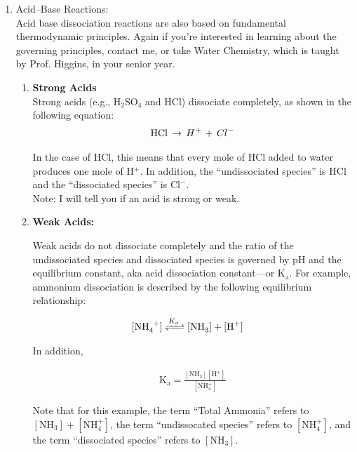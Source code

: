 \documentclass[12pt,letterpaper]{article}
\begin{document}
\begin{enumerate}
\item Acid--Base Reactions:\\

Acid base dissociation reactions are also based on fundamental thermodynamic principles.  Again if you're interested in learning about the governing principles, contact me, or take Water Chemistry, which is taught by Prof. Higgins, in your senior year.\\

\begin{enumerate}

\item \textbf{Strong Acids}\\
Strong acids (e.g., $\mathrm{H_2SO_4}$ and HCl) dissociate completely, as shown in the following equation:\\

\begin{align*}
\cee{HCl}\, \rightarrow \, H^+ \, + \,  Cl^-
\end{align*}

In the case of HCl, this means that every mole of HCl added to water produces one mole of H$^+$.  In addition, the ``undissociated species'' is HCl and the ``dissociated species'' is Cl$^-$.\\

Note: I will tell you if an acid is strong or weak.\\

\item \textbf{Weak Acids:}

Weak acids do not dissociate completely and the ratio of the undissociated species and dissociated species is governed by pH and the equilibrium constant, aka acid dissociation constant---or K$\mathrm{_a}$.  For example, ammonium dissociation is described by the following equilibrium relationship:

\begin{align*}
\cee{[NH_4^+] &<=>[K_a] [NH_3] + [H^+]}
\end{align*}

In addition,

\begin{align*}
\mathrm{K_a = \frac{[NH_3][H^+]}{[NH_4^+]}}
\end{align*}

Note that for this example, the term ``Total Ammonia'' refers to $\mathrm{[NH_3] + [NH_4^+]}$, the term  ``undissocated species'' refers to $\mathrm{[NH_4^+]}$, and the term ``dissociated species'' refers to $\mathrm{[NH_3]}$.\\


\end{enumerate}
\end{enumerate}
\end{document}
